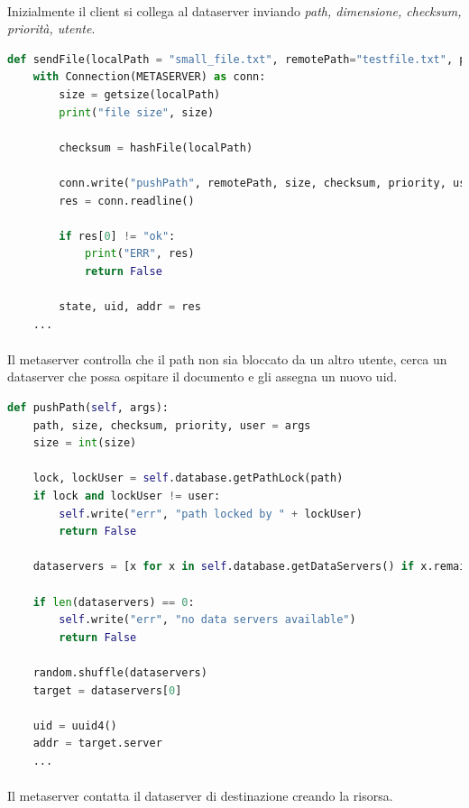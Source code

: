 \documentclass{article}
\begin{document}
\paragraph{} Inizialmente il client si collega al dataserver inviando \emph{path, dimensione, checksum, priorità, utente}.

\begin{lstlisting}[language=Python, title=Client]
def sendFile(localPath = "small_file.txt", remotePath="testfile.txt", priority=1, user="default"):
    with Connection(METASERVER) as conn:
        size = getsize(localPath)
        print("file size", size)

        checksum = hashFile(localPath)

        conn.write("pushPath", remotePath, size, checksum, priority, user)
        res = conn.readline()

        if res[0] != "ok":
            print("ERR", res)
            return False

        state, uid, addr = res
    ...
\end{lstlisting}

\paragraph{} Il metaserver controlla che il path non sia bloccato da un altro utente, cerca un dataserver che possa ospitare il documento e gli assegna un nuovo uid.

\begin{lstlisting}[language=Python, title=Metaserver]
def pushPath(self, args):
    path, size, checksum, priority, user = args
    size = int(size)

    lock, lockUser = self.database.getPathLock(path)
    if lock and lockUser != user:
        self.write("err", "path locked by " + lockUser)
        return False

    dataservers = [x for x in self.database.getDataServers() if x.remaining_capacity > size]

    if len(dataservers) == 0:
        self.write("err", "no data servers available")
        return False

    random.shuffle(dataservers)
    target = dataservers[0]

    uid = uuid4()
    addr = target.server
    ...
\end{lstlisting}

\paragraph{} Il metaserver contatta il dataserver di destinazione creando la risorsa.
\end{document}
